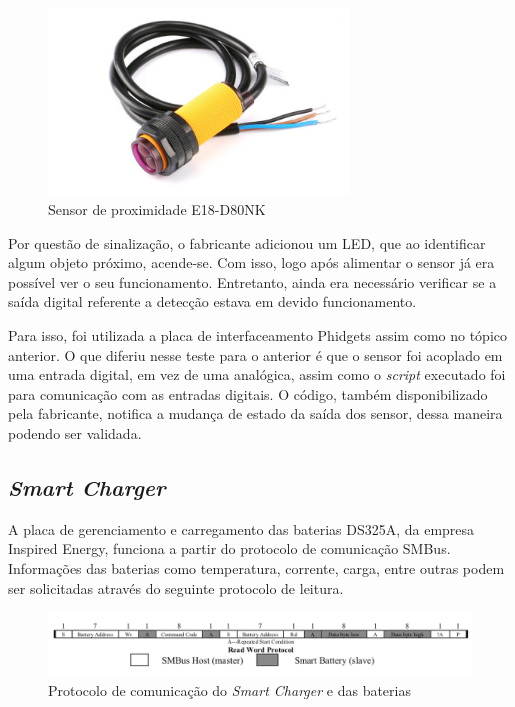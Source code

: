 		\begin{figure}[!ht]
		   \centering
		   \includegraphics[width=8cm]{Figures/proximity_sensor.jpg}
		   \caption{Sensor de proximidade E18-D80NK}
		   \label{fig:E18-D80NK}
		\end{figure}
		
		Por questão de sinalização, o fabricante adicionou um LED, que ao identificar algum objeto próximo, acende-se. Com isso, logo após alimentar o sensor já era possível ver o seu funcionamento. Entretanto, ainda era necessário verificar se a saída digital referente a detecção estava em devido funcionamento.
		
		Para isso, foi utilizada a placa de interfaceamento Phidgets assim como no tópico anterior. O que diferiu nesse teste para o anterior é que o sensor foi acoplado em uma entrada digital, em vez de uma analógica, assim como o \textit{script} executado foi para comunicação com as entradas digitais. O código, também disponibilizado pela fabricante, notifica a mudança de estado da saída dos sensor, dessa maneira podendo ser validada.
		
	\subsection{\textit{Smart Charger}}
    
	    A placa de gerenciamento e carregamento das baterias DS325A, da empresa Inspired Energy, funciona a partir do protocolo de comunicação SMBus. Informações das baterias como temperatura, corrente, carga, entre outras podem ser solicitadas através do seguinte protocolo de leitura.
	    
	    \begin{figure}[!ht]
			   \centering
			   \includegraphics[width=16cm]{Figures/batt_protocol.png}
			   \caption{Protocolo de comunicação do \textit{Smart Charger} e das baterias}
			   \label{fig:batt_protocol}
		\end{figure}   
		
